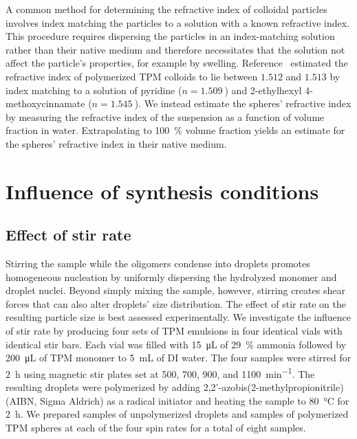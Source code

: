 A common method for determining the refractive index of colloidal particles
involves index matching the particles to a solution with a known refractive index.
This procedure requires dispersing the particles in an index-matching solution
rather than their native medium and therefore necessitates
that the solution not affect the particle's properties, for
example by swelling.  Reference~\cite{vanderwel17} estimated the
refractive index of polymerized TPM colloids to lie between $\num{1.512}$ and $\num{1.513}$
by index matching to a solution of pyridine ($n = \SI{1.509}{}$) and \num{2}-ethylhexyl
\num{4}-methoxycinnamate ($n = \SI{1.545}{}$). We instead estimate the spheres'
refractive index by measuring the refractive index of the suspension as a function of
volume fraction in water. Extrapolating  to \SI{100}{\percent} volume fraction
yields an estimate for the spheres' refractive index \cite{alexander81} in their native medium.

\section{Influence of synthesis conditions}
\subsection{Effect of stir rate}
\label{ssec:stir}
Stirring the sample while the oligomers condense into droplets promotes homogeneous
nucleation by uniformly dispersing the hydrolyzed monomer and droplet nuclei.
Beyond simply mixing the sample, however, stirring creates shear forces that can
also alter droplets' size distribution.
The effect of stir rate on the resulting particle size is best assessed
experimentally.
We investigate the influence of stir rate by producing four sets of TPM emulsions
in four identical vials with identical stir bars. Each vial was filled with
\SI{15}{\micro\liter} of \SI{29}{\percent} ammonia followed by
\SI{200}{\micro\liter} of TPM monomer to \SI{5}{\milli\liter} of DI water.
The four samples were stirred for \SI{2}{\hour}
using magnetic stir plates set at \num{500}, \num{700}, \num{900}, and
\SI{1100}{\minute^{-1}}. 
The resulting droplets were polymerized by adding
\num{2},\num{2}'-azobis(\num{2}-methylpropionitrile) (AIBN, Sigma Aldrich)
as a radical initiator and
heating the sample to \SI{80}{\celsius} for \SI{2}{\hour}.
We prepared samples of unpolymerized droplets and samples of polymerized TPM spheres
at each of the four spin rates for a total of eight samples.

